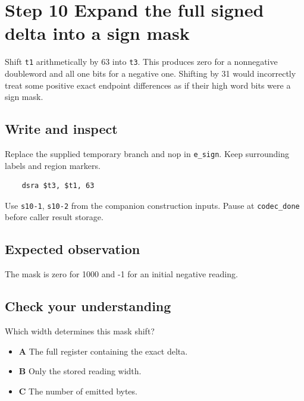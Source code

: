 \section{Step 10 Expand the full signed delta into a sign mask}\label{delta-s10}

Shift \texttt{t1} arithmetically by 63 into \texttt{t3}. This produces zero for a nonnegative doubleword and all one bits for a negative one. Shifting by 31 would incorrectly treat some positive exact endpoint differences as if their high word bits were a sign mask.

\subsection{Write and inspect}
Replace the supplied temporary branch and nop in \texttt{e\_sign}. Keep surrounding labels and region markers.

\begin{verbatim}
    dsra $t3, $t1, 63
\end{verbatim}
Use \texttt{s10-1}, \texttt{s10-2} from the companion construction inputs. Pause at \texttt{codec\_done} before caller result storage.

\subsection{Expected observation}
The mask is zero for 1000 and -1 for an initial negative reading.

\subsection{Check your understanding}
Which width determines this mask shift?

\begin{itemize}
  \item \textbf{A} The full register containing the exact delta.
  \item \textbf{B} Only the stored reading width.
  \item \textbf{C} The number of emitted bytes.
\end{itemize}
